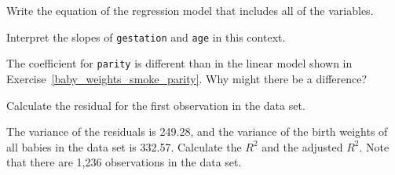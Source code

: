 {\begin{center}
\end{center}
\begin{parts}
\item Write the equation of the regression model that includes all of the 
variables.
\item Interpret the slopes of \texttt{gestation} and \texttt{age} in this 
context.
\item The coefficient for \texttt{parity} is different than in the linear 
model shown in Exercise~\ref{baby_weights_smoke_parity}. Why might there be a difference?
\item Calculate the residual for the first observation in the data set.
\item The variance of the residuals is 249.28, and the variance of the birth 
weights of all babies in the data set is 332.57. Calculate the $R^2$ and the 
adjusted $R^2$. Note that there are 1,236 observations in the data set.
\end{parts}
}{}

\textD{\newpage}



